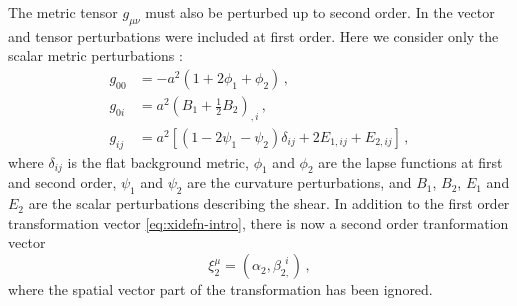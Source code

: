 The metric tensor $g_{\mu\nu}$ must also be perturbed up to second order. In
 the vector and tensor perturbations were included at first
order. Here we consider only the scalar metric perturbations \cite{Malik:2008im}:
%
\begin{align}
\label{eq:metric1-num}
%
g_{00}&= -a^2\left(1+2\phi_1+\phi_2\right) \,, \nonumber\\
%
g_{0i}&= a^2\left(B_1+\frac{1}{2}B_2\right)_{,i}\,, \nonumber\\
%
g_{ij}&= a^2\left[\left(1-2\psi_1-\psi_2\right)\delta_{ij}
+2E_{1,ij}+E_{2,ij}\right]\,,
\end{align}
%
where $\delta_{ij}$ is the flat background metric, $\phi_1$ and $\phi_2$ are the
lapse functions at first and second order, $\psi_1$ and $\psi_2$ are the curvature
perturbations, and $B_1$, $B_2$, $E_1$ and $E_2$ are the
scalar perturbations describing the shear.
% 
In addition to the first order transformation vector \eqref{eq:xidefn-intro}, there
is
now a second order tranformation vector
% 
\begin{equation}
 \label{eq:xi2defn-perts}
\xi_2^\mu = (\alpha_2, \beta_{2,}^{~~i}) \,,
\end{equation}
% 
where the spatial vector part of the transformation has been ignored. 

